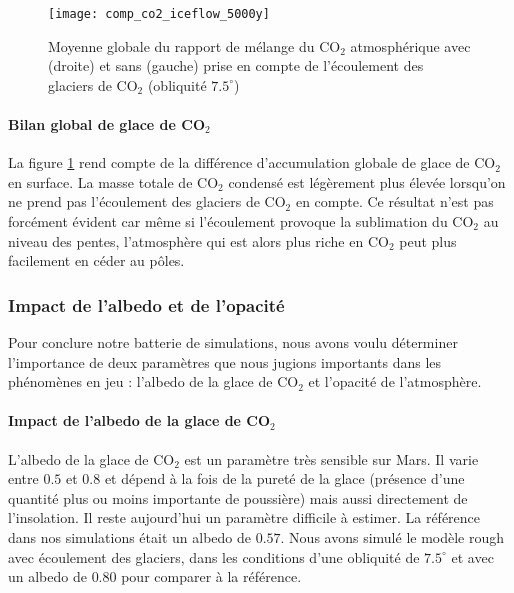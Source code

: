 \documentclass[11pt,a4paper]{article}
\begin{document}
\begin{figure}[h!]
\begin{center}
\texttt{[image: comp\_co2\_iceflow\_5000y]}
\caption{Moyenne globale du rapport de mélange du CO$_2$ atmosphérique avec (droite) et sans (gauche) prise en compte de l'écoulement des glaciers de CO$_2$ (obliquité $7.5^\circ$)}
\label{comp_co2_iceflow_5000y}
\end{center}
\end{figure}

\paragraph{Bilan global de glace de CO$_2$ \\}
La figure \ref{comp_co2_iceflow_5000y} rend compte de la différence d'accumulation globale de glace de CO$_2$ en surface. La masse totale de CO$_2$ condensé est légèrement plus élevée lorsqu'on ne prend pas l'écoulement des glaciers de CO$_2$ en compte. Ce résultat n'est pas forcément évident car même si l'écoulement provoque la sublimation du CO$_2$ au niveau des pentes, l'atmosphère qui est alors plus riche en CO$_2$ peut plus facilement en céder au pôles.  \\ 



\subsubsection{Impact de l'albedo et de l'opacité}
Pour conclure notre batterie de simulations, nous avons voulu déterminer l'importance de deux paramètres que nous jugions importants dans les phénomènes en jeu : l'albedo de la glace de CO$_2$ et l'opacité de l'atmosphère.

\paragraph{Impact de l'albedo de la glace de CO$_2$ \\}
L'albedo de la glace de CO$_2$ est un paramètre très sensible sur Mars. Il varie entre $0.5$ et $0.8$ et dépend à la fois de la pureté de la glace (présence d'une quantité plus ou moins importante de poussière) mais aussi directement de l'insolation. Il reste aujourd'hui un paramètre difficile à estimer. La référence dans nos simulations était un albedo de $0.57$. Nous avons simulé le modèle rough avec écoulement des glaciers, dans les conditions d'une obliquité de $7.5^\circ$ et avec un albedo de $0.80$ pour comparer à la référence. \\
\end{document}
